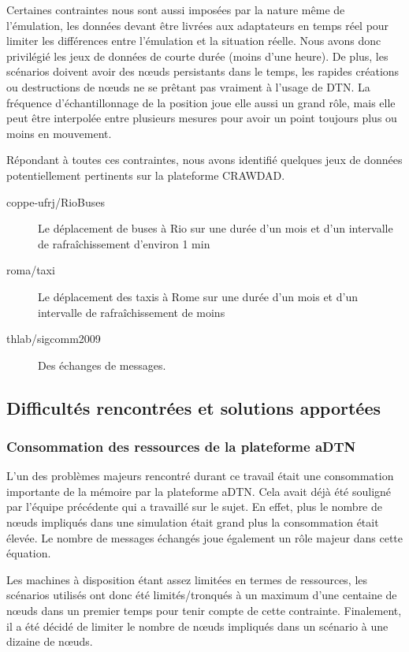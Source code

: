 \documentclass[a4paper,10pt]{article}
\begin{document}
Certaines contraintes nous sont aussi imposées par la nature même de l'émulation, les données devant être livrées aux adaptateurs en temps réel pour limiter les différences entre l'émulation et la situation réelle.
Nous avons donc privilégié les jeux de données de courte durée (moins d'une heure).
De plus, les scénarios doivent avoir des nœuds persistants dans le temps, les rapides créations ou destructions de nœuds ne se prêtant pas vraiment à l'usage de DTN.
La fréquence d'échantillonnage de la position joue elle aussi un grand rôle,
mais elle peut être interpolée entre plusieurs mesures pour avoir un point toujours plus ou moins en mouvement.

Répondant à toutes ces contraintes, nous avons identifié quelques jeux de données potentiellement pertinents sur la plateforme CRAWDAD.

\begin{description}
    \item[coppe-ufrj/RioBuses] Le déplacement de buses à Rio sur une durée d'un mois et d'un intervalle de rafraîchissement d'environ 1 min
    \item[roma/taxi] Le déplacement des taxis à Rome sur une durée d'un mois et d'un intervalle de rafraîchissement de moins 
    \item[thlab/sigcomm2009] Des échanges de messages.
\end{description}

\subsection {Difficultés rencontrées et solutions apportées}

\subsubsection {Consommation des ressources de la plateforme aDTN}
L'un des problèmes majeurs rencontré durant ce travail était une consommation importante de la mémoire par la plateforme aDTN. Cela avait déjà été souligné par l'équipe précédente qui a travaillé sur le sujet. En effet, plus le nombre de nœuds impliqués dans une simulation était grand plus la consommation était élevée. Le nombre de messages échangés joue également un rôle majeur dans cette équation. \par

Les machines à disposition étant assez limitées en termes de ressources, les scénarios utilisés ont donc été limités/tronqués à un maximum d'une centaine de nœuds dans un premier temps pour tenir compte de
cette contrainte. Finalement, il a été décidé de limiter le nombre de nœuds impliqués dans un scénario à une dizaine de nœuds.  \par
\end{document}
